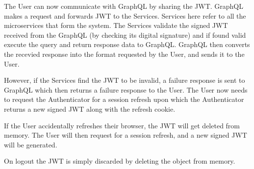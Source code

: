 The User can now communicate with GraphQL by sharing the JWT.
GraphQL makes a request and forwards JWT to the Services. Services here refer to all the microservices that form the system.
The Services validate the signed JWT received from the GraphQL (by checking its digital signature) 
and if found valid execute the query and return response data to GraphQL.
GraphQL then converts the recevied response into the format requested by the User, and sends it to the User.

However, if the Services find the JWT to be invalid, a failure response is sent to
GraphQL which then returns a failure response to the User.
The User now needs to request the Authenticator for a session refresh upon which the Authenticator
returns a new signed JWT along with the refresh cookie.

If the User accidentally refreshes their browser, the JWT will get deleted from memory. 
The User will then request for a session refresh, and a new signed JWT will be generated.

On logout the JWT is simply discarded by deleting the object from memory.

